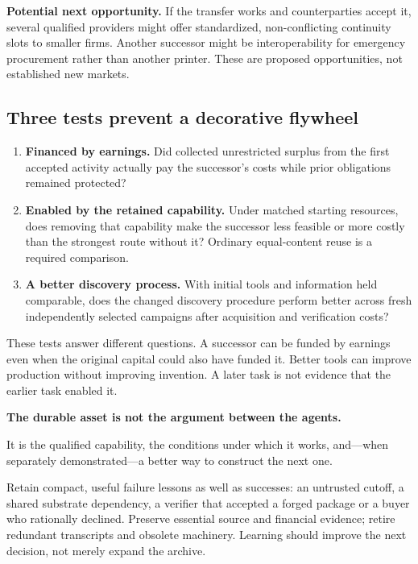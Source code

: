 \documentclass[11pt,a4paper]{article}
\begin{document}
\textbf{Potential next opportunity.} If the transfer works and counterparties accept it, several qualified providers might offer standardized, non-conflicting continuity slots to smaller firms. Another successor might be interoperability for emergency procurement rather than another printer. These are proposed opportunities, not established new markets.

\subsection{Three tests prevent a decorative flywheel}
\begin{enumerate}
\item \textbf{Financed by earnings.} Did collected unrestricted surplus from the first accepted activity actually pay the successor's costs while prior obligations remained protected?
\item \textbf{Enabled by the retained capability.} Under matched starting resources, does removing that capability make the successor less feasible or more costly than the strongest route without it? Ordinary equal-content reuse is a required comparison.
\item \textbf{A better discovery process.} With initial tools and information held comparable, does the changed discovery procedure perform better across fresh independently selected campaigns after acquisition and verification costs?
\end{enumerate}
These tests answer different questions. A successor can be funded by earnings even when the original capital could also have funded it. Better tools can improve production without improving invention. A later task is not evidence that the earlier task enabled it.

\begin{insight}
\textbf{The durable asset is not the argument between the agents.}\par
It is the qualified capability, the conditions under which it works, and---when separately demonstrated---a better way to construct the next one.
\end{insight}

Retain compact, useful failure lessons as well as successes: an untrusted cutoff, a shared substrate dependency, a verifier that accepted a forged package or a buyer who rationally declined. Preserve essential source and financial evidence; retire redundant transcripts and obsolete machinery. Learning should improve the next decision, not merely expand the archive.
\end{document}

